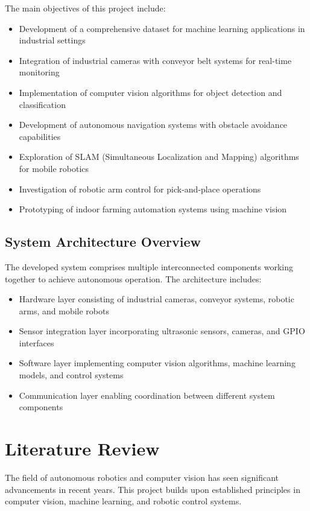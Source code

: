 \documentclass{book}
\begin{document}
\par\noindent The main objectives of this project include:

\begin{itemize}
\item Development of a comprehensive dataset for machine learning applications in industrial settings
\item Integration of industrial cameras with conveyor belt systems for real-time monitoring
\item Implementation of computer vision algorithms for object detection and classification
\item Development of autonomous navigation systems with obstacle avoidance capabilities
\item Exploration of SLAM (Simultaneous Localization and Mapping) algorithms for mobile robotics
\item Investigation of robotic arm control for pick-and-place operations
\item Prototyping of indoor farming automation systems using machine vision
\end{itemize}

\section{System Architecture Overview}

\par\noindent The developed system comprises multiple interconnected components working together to achieve autonomous operation. The architecture includes:

\begin{itemize}
\item Hardware layer consisting of industrial cameras, conveyor systems, robotic arms, and mobile robots
\item Sensor integration layer incorporating ultrasonic sensors, cameras, and GPIO interfaces
\item Software layer implementing computer vision algorithms, machine learning models, and control systems
\item Communication layer enabling coordination between different system components
\end{itemize}

\chapter{Literature Review}

\par\noindent The field of autonomous robotics and computer vision has seen significant advancements in recent years. This project builds upon established principles in computer vision, machine learning, and robotic control systems.
\end{document}
